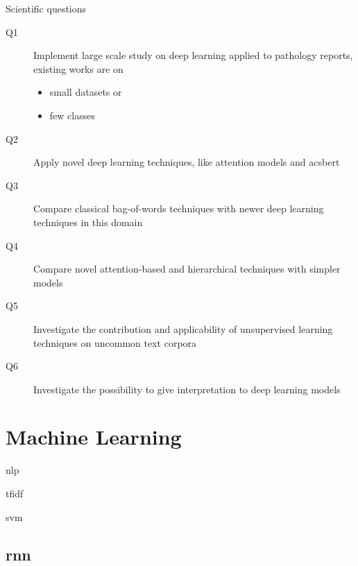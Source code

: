 \begin{frame}{Scientific questions}
  \begin{description}
  \item[Q1] Implement \alert{large scale} study on deep learning
    applied to pathology reports, existing works are on
    \begin{itemize}
    \item \alert{small} datasets or
    \item \alert{few} classes
    \end{itemize}
  \item[Q2] Apply \alert{novel} deep learning techniques, like
    \alert{attention} models and \alert{acs{bert}}
  \item[Q3] \alert{Compare} classical \alert{bag-of-words} techniques with
    newer deep learning techniques in this domain
  \item[Q4] \alert{Compare} novel \alert{attention}-based and
    \alert{hierarchical} techniques with simpler models
  \item[Q5] \alert{Investigate} the contribution and applicability of
    \alert{unsupervised} learning techniques on uncommon text corpora
  \item[Q6] \alert{Investigate} the possibility to give
    \alert{interpretation} to deep learning models
  \end{description}
\end{frame}


\section{Machine Learning}

\begin{frame}{\acf{nlp}}
  
\end{frame}

\begin{frame}{\acf{tfidf}}
  
\end{frame}

\begin{frame}{\acf{svm}}
  
\end{frame}

\subsection{\acs{rnn}}

